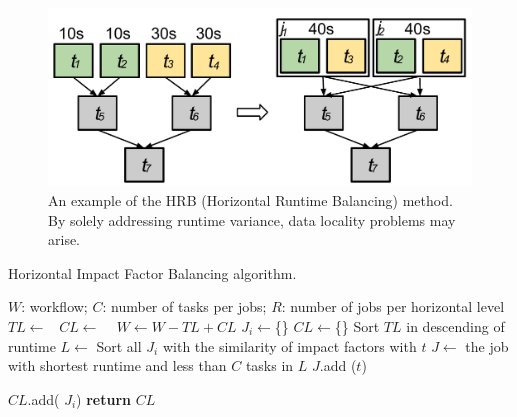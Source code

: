 \begin{figure}[htb]
	\centering
	\includegraphics[width=0.85\linewidth]{figures/balance/figure8.pdf}
	\caption{An example of the HRB (Horizontal Runtime Balancing) method. By solely addressing runtime variance, data locality problems may arise.}
	\label{fig:imbalance_hrb}
\end{figure}

\begin{algorithm}[!htb]
	\footnotesize
	\caption{Horizontal Impact Factor Balancing algorithm.}
	\label{alg:imbalance_hifb}
	\begin{algorithmic}[1]
		\Require $W$: workflow; $C$: number of tasks per jobs; $R$: number of jobs per horizontal level
				\State $TL\gets $\  
				\State $CL\gets$  \  
				\State $W \gets W - TL + CL$   
			\EndFor
		\EndProcedure
			\State $J_i\gets$\{\}
			\EndFor
			\State $CL\gets$\{\}
			\State Sort $TL$ in descending of runtime
				\State $L\gets$ Sort all $J_i$ with the similarity of impact factors with $t$
				\State $J\gets$ the job with shortest runtime and less than $C$ tasks in $L$
				\State $J$.add ($t$) 
				
			\EndFor
			\State  $CL$.add( $J_i$)
			\EndFor
			\State \textbf{return} $CL$
		\EndProcedure
	\end{algorithmic}
\end{algorithm}


